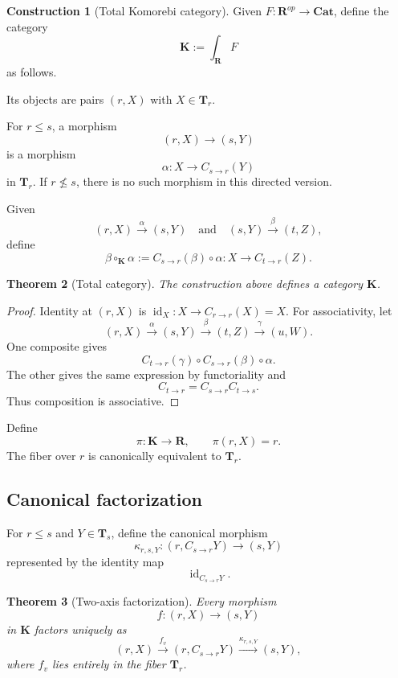 \documentclass[11pt]{article}
\newtheorem{theorem}{Theorem}[section]
\theoremstyle{definition}
\newtheorem{construction}[theorem]{Construction}
\theoremstyle{remark}
\newcommand{\K}{\mathbf K}
\newcommand{\Rcat}{\mathbf R}
\newcommand{\Tcat}{\mathbf T}
\newcommand{\Cat}{\mathbf{Cat}}
\newcommand{\id}{\operatorname{id}}
\begin{document}
\begin{construction}[Total Komorebi category]\label{cons:groth}
Given $F:\Rcat^{op}\to\Cat$, define the category
\[
\K:=\int_{\Rcat}F
\]
as follows.

Its objects are pairs $(r,X)$ with $X\in\Tcat_r$.

For $r\le s$, a morphism
\[
(r,X)\longrightarrow(s,Y)
\]
is a morphism
\[
\alpha:X\longrightarrow C_{s\to r}(Y)
\]
in $\Tcat_r$. If $r\nleq s$, there is no such morphism in this directed version.
\end{construction}

Given
\[
(r,X)\xrightarrow{\alpha}(s,Y)
\quad\text{and}\quad
(s,Y)\xrightarrow{\beta}(t,Z),
\]
define
\[
\beta\circ_{\K}\alpha
:=
C_{s\to r}(\beta)\circ\alpha:
X\to C_{t\to r}(Z).
\]

\begin{theorem}[Total category]\label{thm:total-category}
The construction above defines a category $\K$.
\end{theorem}

\begin{proof}
Identity at $(r,X)$ is $\id_X:X\to C_{r\to r}(X)=X$. For associativity, let
\[
(r,X)\xrightarrow{\alpha}(s,Y)
\xrightarrow{\beta}(t,Z)
\xrightarrow{\gamma}(u,W).
\]
One composite gives
\[
C_{t\to r}(\gamma)\circ C_{s\to r}(\beta)\circ\alpha.
\]
The other gives the same expression by functoriality and
\[
C_{t\to r}=C_{s\to r}C_{t\to s}.
\]
Thus composition is associative.
\end{proof}

Define
\[
\pi:\K\to\Rcat,
\qquad
\pi(r,X)=r.
\]
The fiber over $r$ is canonically equivalent to $\Tcat_r$.

\subsection{Canonical factorization}

For $r\le s$ and $Y\in\Tcat_s$, define the canonical morphism
\[
\kappa_{r,s,Y}:
(r,C_{s\to r}Y)\longrightarrow(s,Y)
\]
represented by the identity map
\[
\id_{C_{s\to r}Y}.
\]

\begin{theorem}[Two-axis factorization]\label{thm:factorization}
Every morphism
\[
f:(r,X)\longrightarrow(s,Y)
\]
in $\K$ factors uniquely as
\[
(r,X)
\xrightarrow{f_v}
(r,C_{s\to r}Y)
\xrightarrow{\kappa_{r,s,Y}}
(s,Y),
\]
where $f_v$ lies entirely in the fiber $\Tcat_r$.
\end{theorem}
\end{document}
